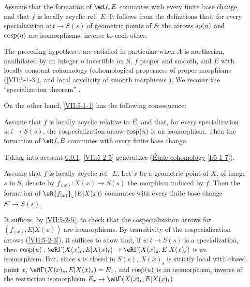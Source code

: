 \subsubsection{}\label{VII:5-2-4}

Assume that the formation of $\eR f_\ast E$ commutes with every finite base
change, and that $f$ is locally acyclic rel.\ $E$. It follows from the
definitions that, for every specialization $u:t\to S(s)$ of geometric
points of $S$; the arrows $\operatorname{sp}(u)$ and $\operatorname{cosp}(u)$ are
isomorphisms, inverse to each other.

The preceding hypotheses are satisfied in particular when $A$ is
noetherian, annihilated by an integer $n$ invertible on $S$, $f$ proper and
smooth, and $E$ with locally constant cohomology (cohomological properness
of proper morphisms (\ref{VII:5-1-3}), and local acyclicity of smooth morphisms
\cite[XV]{sga4}). We recover the ``specialization theorem''
\cite[XVI 2.1]{sga4}.

On the other hand, \ref{VII:5-1-1} has the following consequence:




\begin{proposition}\label{VII:5-2-5}
Assume that $f$ is locally acyclic relative to $E$, and that, for
every specialization $u:t\to S(s)$, the cospecialization arrow
$\operatorname{cosp}(u)$ is an isomorphism. Then the formation of $\eR f_\ast E$ commutes
with every finite base change.
\end{proposition}

Taking into account \ref{VII:5-2-4}, \ref{VII:5-2-5} generalizes
(\hyperref[I]{\'Etale cohomology} \ref{I:5-1-7}).




\begin{corollary}\label{VII:5-2-6}
Assume that $f$ is locally acyclic rel.\ $E$. Let $x$ be a geometric
point of $X$, of image $s$ in $S$, denote by $f_{(x)}:X(x)\to S(s)$ the
morphism induced by $f$. Then the formation of $\eR {f_{(x)}}_\ast(E|X(x))$
commutes with every finite base change $S'\to S(s)$.
\end{corollary}

It suffices, by \ref{VII:5-2-5}, to check that the
cospecialization arrows for $(f_{(x)},E|X(x))$ are isomorphisms. By
transitivity of the cospecialization arrows (\ref{VII:5-2-3}), it suffices
to show that, if $u:t\to S(s)$ is a specialization, then
$\cosp(u):\eR\Gamma(X(x)_t,E|X(x)_t)\to \eR\Gamma(X(x)_s,E|X(x)_s)$ is an
isomorphism. But, since $s$ is closed in $S(s)$, $X(x)_s$ is strictly
local with closed point $x$, $\eR\Gamma(X(x)_s,E|X(x)_s)=E_x$, and
$\operatorname{cosp}(u)$ is an isomorphism, inverse of the restriction isomorphism
$E_x\to \eR\Gamma(X(x)_t,E|X(x)_t)$.




